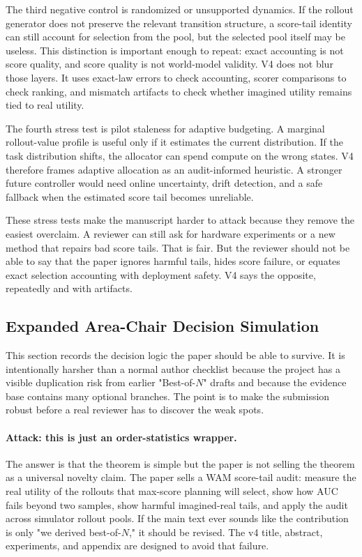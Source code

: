 The third negative control is randomized or unsupported dynamics. If the
rollout generator does not preserve the relevant transition structure, a
score-tail identity can still account for selection from the pool, but the
selected pool itself may be useless. This distinction is important enough to
repeat: exact accounting is not score quality, and score quality is not
world-model validity. V4 does not blur those layers. It uses exact-law errors
to check accounting, scorer comparisons to check ranking, and mismatch
artifacts to check whether imagined utility remains tied to real utility.

The fourth stress test is pilot staleness for adaptive budgeting. A marginal
rollout-value profile is useful only if it estimates the current distribution.
If the task distribution shifts, the allocator can spend compute on the wrong
states. V4 therefore frames adaptive allocation as an audit-informed heuristic.
A stronger future controller would need online uncertainty, drift detection,
and a safe fallback when the estimated score tail becomes unreliable.

These stress tests make the manuscript harder to attack because they remove
the easiest overclaim. A reviewer can still ask for hardware experiments or a
new method that repairs bad score tails. That is fair. But the reviewer should
not be able to say that the paper ignores harmful tails, hides score failure,
or equates exact selection accounting with deployment safety. V4 says the
opposite, repeatedly and with artifacts.

\subsection{Expanded Area-Chair Decision Simulation}
\label{app:ac-simulation}

This section records the decision logic the paper should be able to survive.
It is intentionally harsher than a normal author checklist because the project
has a visible duplication risk from earlier "Best-of-$N$" drafts and because
the evidence base contains many optional branches. The point is to make the
submission robust before a real reviewer has to discover the weak spots.

\paragraph{Attack: this is just an order-statistics wrapper.}
The answer is that the theorem is simple but the paper is not selling the
theorem as a universal novelty claim. The paper sells a WAM score-tail audit:
measure the real utility of the rollouts that max-score planning will select,
show how AUC fails beyond two samples, show harmful imagined-real tails, and
apply the audit across simulator rollout pools. If the main text ever sounds
like the contribution is only "we derived best-of-$N$," it should be revised.
The v4 title, abstract, experiments, and appendix are designed to avoid that
failure.

